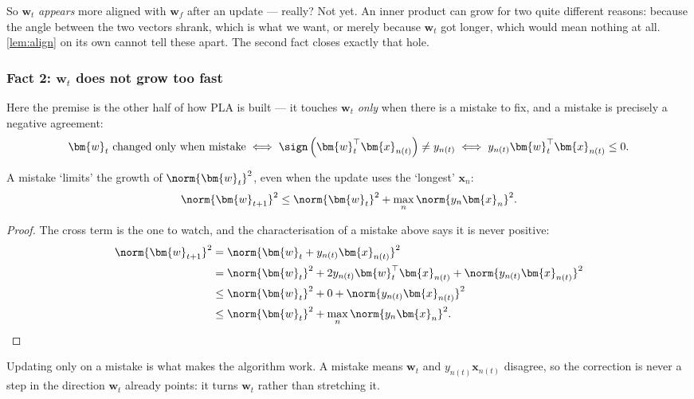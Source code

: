 So \(\bm{w}_t\) \emph{appears} more aligned with \(\bm{w}_f\) after an update
--- really? Not yet. An inner product can grow for two quite different reasons:
because the angle between the two vectors shrank, which is what we want, or
merely because \(\bm{w}_t\) got longer, which would mean nothing at all.
\autoref{lem:align} on its own cannot tell these apart. The second fact closes
exactly that hole.

\subsubsection*{Fact 2: \texorpdfstring{\(\bm{w}_t\)}{w\_t} does not grow too
fast}

Here the premise is the other half of how PLA is built --- it touches
\(\bm{w}_t\) \emph{only} when there is a mistake to fix, and a mistake is
precisely a negative agreement:
\[
    \bm{w}_t \text{ changed only when mistake}
    \iff \sign \left( \bm{w}_t^\top \bm{x}_{n(t)} \right) \neq y_{n(t)}
    \iff y_{n(t)} \bm{w}_t^\top \bm{x}_{n(t)} \le 0 .
\]

\begin{lemma}\label{lem:norm}
    A mistake `limits' the growth of \(\norm{\bm{w}_t}^2\), even when the update
    uses the `longest' \(\bm{x}_n\):
    \[
        \norm{\bm{w}_{t+1}}^2
        \le \norm{\bm{w}_t}^2 + \max_n \norm{y_n \bm{x}_n}^2 .
    \]
\end{lemma}

\begin{proof}
    The cross term is the one to watch, and the characterisation of a mistake
    above says it is never positive:
    \begin{align*}
        \norm{\bm{w}_{t+1}}^2
        &= \norm{\bm{w}_t + y_{n(t)} \bm{x}_{n(t)}}^2\\
        &= \norm{\bm{w}_t}^2 + 2 y_{n(t)} \bm{w}_t^\top \bm{x}_{n(t)}
            + \norm{y_{n(t)} \bm{x}_{n(t)}}^2\\
        &\le \norm{\bm{w}_t}^2 + 0 + \norm{y_{n(t)} \bm{x}_{n(t)}}^2\\
        &\le \norm{\bm{w}_t}^2 + \max_n \norm{y_n \bm{x}_n}^2 . \qedhere
    \end{align*}
\end{proof}

\begin{intuition}
    Updating only on a mistake is what makes the algorithm work. A mistake means
    \(\bm{w}_t\) and \(y_{n(t)} \bm{x}_{n(t)}\) disagree, so the correction is
    never a step in the direction \(\bm{w}_t\) already points: it turns
    \(\bm{w}_t\) rather than stretching it.
\end{intuition}

